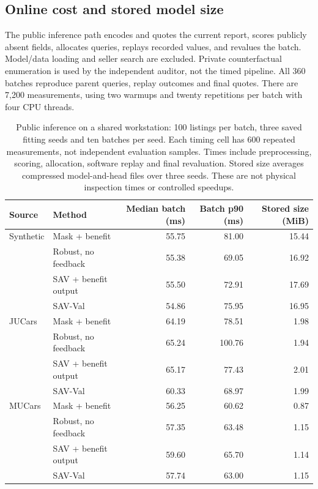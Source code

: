 \documentclass[10pt,journal]{IEEEtran}
\begin{document}
\subsection{Online cost and stored model size}
The public inference path encodes and quotes the current report, scores
publicly absent fields, allocates queries, replays recorded values, and
revalues the batch. Model/data loading and seller search are excluded.
Private counterfactual enumeration is used by the independent auditor,
not the timed pipeline. All 360 batches reproduce parent queries, replay
outcomes and final quotes. There are 7,200 measurements, using two warmups
and twenty repetitions per batch with four CPU threads.

\begin{table}[t]
\centering
\caption{Public inference on a shared workstation: 100 listings per batch,
three saved fitting seeds and ten batches per seed. Each timing cell has
600 repeated measurements, not independent evaluation samples. Times
include preprocessing, scoring, allocation, software replay and final
revaluation. Stored size averages compressed model-and-head files over
three seeds. These are not physical inspection times or controlled speedups.}
\label{tab:online_resources}
\begin{tabular}{llrrr}
\toprule
Source & Method & Median batch (ms) & Batch p90 (ms) & Stored size (MiB)\\
\midrule
Synthetic & Mask + benefit & 55.75 & 81.00 & 15.44\\
 & Robust, no feedback & 55.38 & 69.05 & 16.92\\
 & SAV + benefit output & 55.50 & 72.91 & 17.69\\
 & SAV-Val & 54.86 & 75.95 & 16.95\\
\midrule
JUCars & Mask + benefit & 64.19 & 78.51 & 1.98\\
 & Robust, no feedback & 65.24 & 100.76 & 1.94\\
 & SAV + benefit output & 65.17 & 77.43 & 2.01\\
 & SAV-Val & 60.33 & 68.97 & 1.99\\
\midrule
MUCars & Mask + benefit & 56.25 & 60.62 & 0.87\\
 & Robust, no feedback & 57.35 & 63.48 & 1.15\\
 & SAV + benefit output & 59.60 & 65.70 & 1.14\\
 & SAV-Val & 57.74 & 63.00 & 1.15\\
\bottomrule
\end{tabular}
\end{table}
\end{document}
